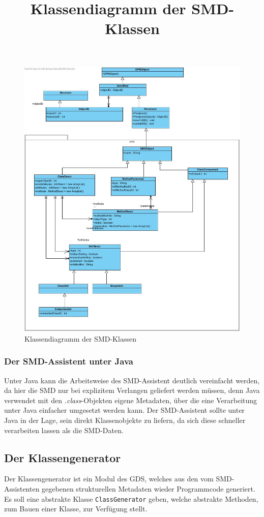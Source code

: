 \begin{figure}[!ht]
\centering
\includegraphics[width=13cm]{Bilder/SMD_Klassen}
\title{Klassendiagramm der SMD-Klassen}
\caption{Klassendiagramm der SMD-Klassen}
\centering
\end{figure}

\subsubsection{Der SMD-Assistent unter Java}
Unter Java kann die Arbeitsweise des SMD-Assistent deutlich vereinfacht werden, da hier die \ac{SMD} nur bei explizitem Verlangen geliefert werden m\"ussen, denn Java verwendet mit den \textit{.class}-Objekten eigene Metadaten, \"uber die eine Verarbeitung unter Java einfacher umgesetzt werden kann. 
Der SMD-Assistent sollte unter Java in der Lage, sein direkt Klassenobjekte zu liefern, da sich diese schneller verarbeiten lassen als die \ac{SMD}-Daten.

\subsection{Der Klassengenerator} \label{CG}
Der Klassengenerator ist ein Modul des \ac{GDS}, welches aus den vom \ac{SMD}-Assistenten gegebenen strukturellen Metadaten wieder Programmcode generiert. Es soll eine abstrakte Klasse \texttt{ClassGenerator} geben, welche abstrakte Methoden, zum Bauen einer Klasse, zur Verf\"ugung stellt. 

